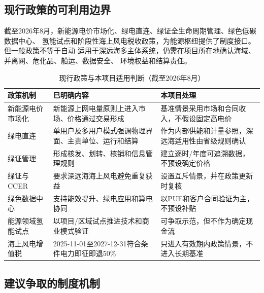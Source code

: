 \subsection{现行政策的可利用边界}

截至2026年8月，新能源电价市场化、绿电直连、绿证全生命周期管理、绿色低碳数据中心、
氢能试点和阶段性海上风电税收政策，为能源枢纽提供了制度接口。但一般政策不等于自动
适用于深远海多主体系统，仍需在项目所在地确认海域、并离网、危化品、船运、数据安全、
环境权益和结算责任。

\begin{table}[H]
\centering
\caption{现行政策与本项目适用判断（截至2026年8月）}
\label{tab:c6-policy}
\footnotesize
\begin{tabularx}{\textwidth}{p{2.6cm} X X}
\toprule
政策机制 & 已明确内容 & 本项目处理\\
\midrule
新能源电价市场化 & 新能源上网电量原则上进入市场、价格通过交易形成\cite{ndrc-price} & 基准情景采用市场和合同收入，不假设固定高电价\\
绿电直连 & 单用户及多用户模式强调物理界面、主责单位、运行和结算\cite{ndrc-direct,ndrc-multiuser} & 作为内部供能和计量参照，深远海适用性由省级规则确认\\
绿证管理 & 形成核发、划转、核销和信息管理规则\cite{nea-green-cert} & 建立逐时/年度可追溯数据，不预设确定价格\\
绿证与CCER & 要求深远海海上风电避免重复获益\cite{green-cert-ccer} & 设置互斥情景，并在政策更新时复核\\
绿色数据中心 & 支持能效提升、绿电应用和算电协同\cite{ndrc-data-center} & 以PUE和客户合同验证为主，不预设补贴\\
能源领域氢能试点 & 以项目/区域试点推进技术和商业模式验证\cite{nea-hydrogen-pilot} & 可争取示范，但不作为确定现金流\\
海上风电增值税 & 2025-11-01至2027-12-31符合条件电力即征即退50\%\cite{mof-vat} & 只进入有效期内政策情景，不进入长期基准\\
\bottomrule
\end{tabularx}
\end{table}

\subsection{建议争取的制度机制}

